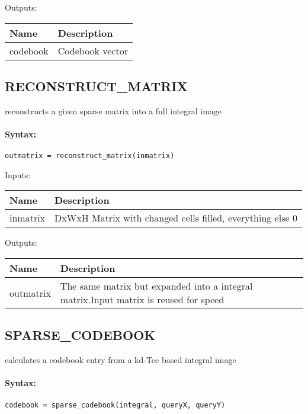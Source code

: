 \bigskip
Outputs:

\begin{tabular}{|p{}|p{}|}
\hline
\textbf{Name} & \textbf{Description} \\
\hline \hline
codebook & Codebook vector  \\ \hline
\end{tabular}

\subsection{RECONSTRUCT\_MATRIX}

reconstructs a given sparse matrix into a full integral image

\paragraph{Syntax:} \verb|outmatrix = reconstruct_matrix(inmatrix)|

\bigskip
Inputs:

\begin{tabular}{|p{}|p{}|}
\hline
\textbf{Name} & \textbf{Description} \\
\hline \hline
inmatrix & DxWxH Matrix with changed cells filled, everything else 0  \\ \hline
\end{tabular}

\bigskip
Outputs:

\begin{tabular}{|p{}|p{}|}
\hline
\textbf{Name} & \textbf{Description} \\
\hline \hline
outmatrix & The same matrix but expanded into a integral matrix.Input matrix is reused for speed  \\ \hline
\end{tabular}

\subsection{SPARSE\_CODEBOOK}

calculates a codebook entry from a kd-Tee based integral image

\paragraph{Syntax:} \verb|codebook = sparse_codebook(integral, queryX, queryY)|

